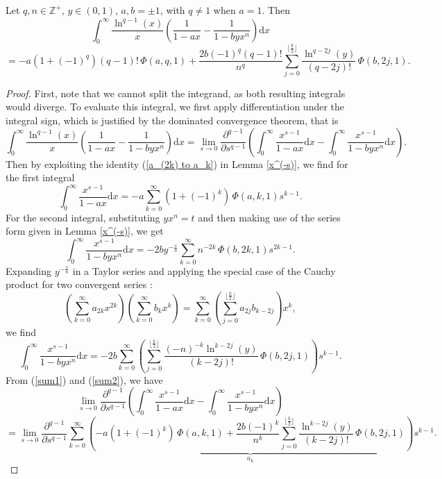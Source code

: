 \documentclass[11pt,reqno]{article}
\begin{document}
\begin{lemma} \label{tough integral}
	Let $q,n\in\mathbb{Z}^{+}$, $y\in(0,1)$, $a,b=\pm1$, with $q\neq1$ when $a=1$. Then
	\[\int_0^\infty \frac{\ln^{q-1}(x)}{x}\left(\frac{1}{1-ax}-\frac{1}{1-byx^{n}}\right)\mathrm{d} x\]
	\[=-a(1+{(-1)}^{q})(q-1)!\,\Phi(a,q,1)
	+\frac{2b{(-1)}^{q} (q-1)!}{n^{q}}\sum_{j=0}^{\lfloor\frac{q}{2}\rfloor}\frac{\ln^{q-2j}(y)}{(q-2j)!}\,\Phi(b,2j,1).\]
\end{lemma}
\begin{proof}
	First, note that we cannot split the integrand, as both resulting integrals would diverge. To evaluate this integral, we first apply differentiation under the integral sign, which is justified by the dominated convergence theorem, that is
	\[\int_0^\infty \frac{\ln^{q-1}(x)}{x}\left(\frac{1}{1-ax}-\frac{1}{1-byx^{n}}\right)\mathrm{d} x
	=\lim_{s\to0}\frac{\partial^{q-1}}{\partial s^{q-1}}\left(\int_0^\infty\frac{x^{s-1}}{1-ax}\mathrm{d} x-\int_0^\infty\frac{x^{s-1}}{1-byx^n}\mathrm{d} x\right).\]
	Then by exploiting the identity (\ref{a_(2k) to a_k}) in Lemma \ref{x^(-s)}, we find for the first integral
	\begin{equation}
		\int_0^\infty\frac{x^{s-1}}{1-ax}\mathrm{d} x=-a\sum_{k=0}^\infty(1+{(-1)}^{k})\,\Phi(a,k,1)s^{k-1}.\label{sum1}
	\end{equation}
	For the second integral, substituting $yx^n=t$ and then making use of the series form given in Lemma \ref{x^(-s)}, we get
	\[\int_0^\infty\frac{x^{s-1}}{1-byx^n}\mathrm{d} x=-2by^{-\frac{s}{n}}\sum_{k=0}^\infty n^{-2k}\,\Phi(b,2k,1)s^{2k-1}.\]
	Expanding $y^{-\frac{s}{n}}$ in a Taylor series and applying the special case of the Cauchy product for two convergent series \cite[p.115]{ali}:
	\[\left(\sum_{k=0}^\infty a_{2k}x^{2k}\right)\left(\sum_{k=0}^\infty b_{k}x^{k}\right)=\sum_{k=0}^\infty\left(\sum_{j=0}^{\lfloor\frac{k}{2}\rfloor}a_{2j}b_{k-2j}\right)x^{k},\]
	we find
	\begin{equation}
		\int_0^\infty\frac{x^{s-1}}{1-byx^n}\mathrm{d} x=-2b\sum_{k=0}^\infty \left(\sum_{j=0}^{\lfloor\frac{k}{2}\rfloor}\frac{{(-n)}^{-k}\ln^{k-2j}(y)}{(k-2j)!}\,\Phi(b,2j,1)\right)s^{k-1}.\label{sum2}
	\end{equation}
	From (\ref{sum1}) and (\ref{sum2}), we have
	\[\lim_{s\to0}\frac{\partial^{q-1}}{\partial s^{q-1}}\left(	\int_0^\infty\frac{x^{s-1}}{1-ax}\mathrm{d} x-\int_0^\infty\frac{x^{s-1}}{1-byx^n}\mathrm{d} x\right)\]
	\[=\lim_{s\to0}\frac{\partial^{q-1}}{\partial s^{q-1}}\sum_{k=0}^\infty\underbrace{\left(-a(1+{(-1)}^{k})\,\Phi(a,k,1)+\frac{2b{(-1)}^{k}}{n^{k}}\sum_{j=0}^{\lfloor\frac{k}{2}\rfloor}\frac{\ln^{k-2j}(y)}{(k-2j)!}\,\Phi(b,2j,1)\right)}_{a_{k}}s^{k-1}.\]

\end{proof}
\end{document}
